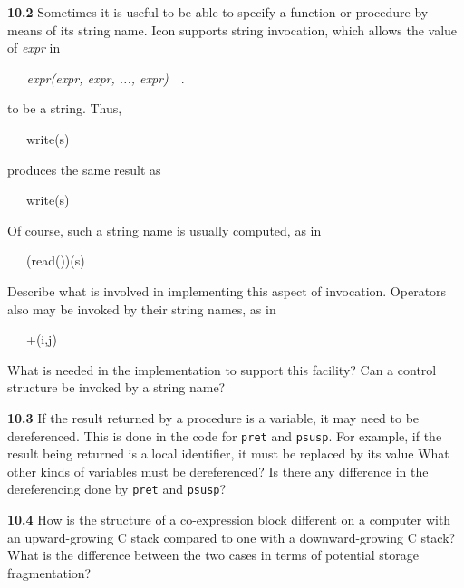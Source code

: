 \textbf{10.2} Sometimes it is useful to be able to specify a function
or procedure by means of its string name. Icon supports
{\textquotedbl}string invocation,{\textquotedbl} which allows the
value of \textit{expr} in

{\ttfamily\mdseries
\textit{\ \ \ expr(expr,
expr, ..., expr)}\ \ .}

\noindent to be a string. Thus,

{\ttfamily\mdseries
\ \ \ {\textquotedbl}write{\textquotedbl}(s)}

\noindent produces the same result as

{\ttfamily\mdseries
\ \ \ write(s)}

Of course, such a string name is usually computed, as in

{\ttfamily\mdseries
\ \ \ (read())(s)}

Describe what is involved in implementing this aspect of
invocation. Operators also may be invoked by their string names, as in

{\ttfamily\mdseries
\ \ \ {\textquotedbl}+{\textquotedbl}(i,j)}

What is needed in the implementation to support this facility? Can a
control structure be invoked by a string name?

\textbf{10.3} If the result returned by a procedure is a variable, it
may need to be dereferenced. This is done in the code for
\texttt{pret} and \texttt{psusp}. For example, if the result being
returned is a local identifier, it must be replaced by its value What
other kinds of variables must be dereferenced? Is there any difference
in the dereferencing done by \texttt{pret} and \texttt{psusp}?

\textbf{10.4} How is the structure of a co-expression block different
on a computer with an upward-growing C stack compared to one with a
downward-growing C stack? What is the difference between the two cases
in terms of potential storage fragmentation?
